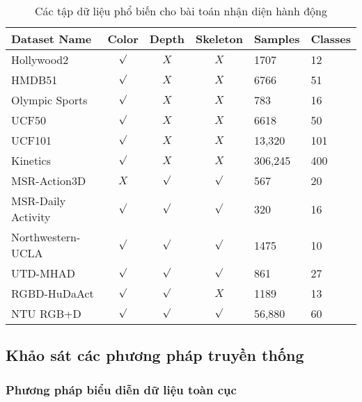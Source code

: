 \begin{table}[]
    \centering
    \begin{tabular}{|l|c|c|c|l|l|}
        \hline
        Dataset Name       & Color   & Depth   & Skeleton & Samples & Classes \\ \hline
        Hollywood2         & $\surd$ & $X$     & $X$      & 1707    & 12      \\ \hline
        HMDB51             & $\surd$ & $X$     & $X$      & 6766    & 51      \\ \hline
        Olympic Sports     & $\surd$ & $X$     & $X$      & 783     & 16      \\ \hline
        UCF50              & $\surd$ & $X$     & $X$      & 6618    & 50      \\ \hline
        UCF101             & $\surd$ & $X$     & $X$      & 13,320  & 101     \\ \hline
        Kinetics           & $\surd$ & $X$     & $X$      & 306,245 & 400     \\ \hline
        MSR-Action3D       & $X$     & $\surd$ & $\surd$  & 567     & 20      \\ \hline
        MSR-Daily Activity & $\surd$ & $\surd$ & $\surd$  & 320     & 16      \\ \hline
        Northwestern-UCLA  & $\surd$ & $\surd$ & $\surd$  & 1475    & 10      \\ \hline
        UTD-MHAD           & $\surd$ & $\surd$ & $\surd$  & 861     & 27      \\ \hline
        RGBD-HuDaAct       & $\surd$ & $\surd$ & $X$      & 1189    & 13      \\ \hline
        NTU RGB+D          & $\surd$ & $\surd$ & $\surd$  & 56,880  & 60      \\ \hline
    \end{tabular}
    \caption{Các tập dữ liệu phổ biến cho bài toán nhận diện hành động}
    \label{table:dataset-popular}
\end{table}

\subsection{Khảo sát các phương pháp truyền thống}
\label{survey:method-handcraft}

\subsubsection{Phương pháp biểu diễn dữ liệu toàn cục}

